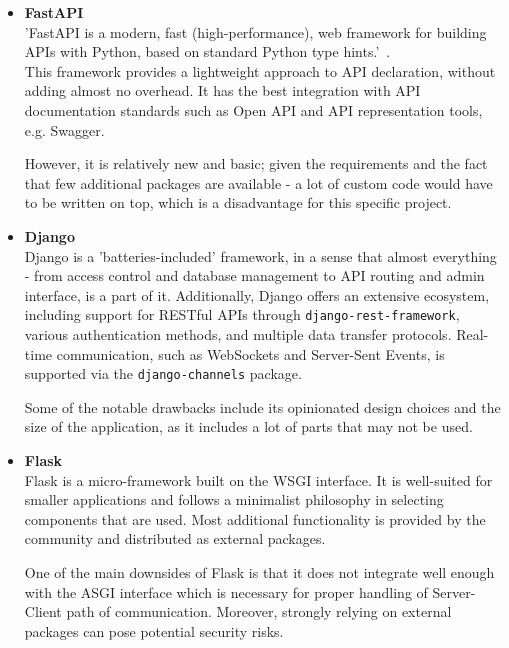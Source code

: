 \begin{itemize}
    \item \textbf{FastAPI} \\
    'FastAPI is a modern, fast (high-performance), web framework for building APIs
    with Python, based on standard Python type hints.'~\cite{fastapi}. \\
    This framework provides a lightweight approach to API declaration, without adding almost no overhead.
    It has the best integration with API documentation standards such as
    Open API and API representation tools, e.g. Swagger.

    However, it is relatively new and basic; given the requirements and the fact that
    few additional packages are available - a lot of custom code would have
    to be written on top, which is a disadvantage for this specific project.

    \item \textbf{Django} \\
    Django is a 'batteries-included' framework, in a sense that almost everything -
    from access control and database management to API routing and admin interface,
    is a part of it.\cite{django}
    Additionally, Django offers an extensive ecosystem, including support for RESTful APIs through
    \texttt{django-rest-framework}\cite{drf}, various authentication methods,
    and multiple data transfer protocols. Real-time communication, such as WebSockets and Server-Sent Events,
    is supported via the \texttt{django-channels}\cite{django_channels} package.

    Some of the notable drawbacks include its opinionated design choices and the size of the application,
    as it includes a lot of parts that may not be used.

    \item \textbf{Flask} \\
    Flask is a micro-framework built on the WSGI interface.
    It is well-suited for smaller applications and follows a minimalist philosophy
    in selecting components that are used.\cite{flask} Most additional functionality is provided by
    the community and distributed as external packages.

    One of the main downsides of Flask is that it does not integrate well enough with the ASGI
    interface which is necessary for proper handling of Server-Client path of communication.
    Moreover, strongly relying on external packages can pose potential security risks.
\end{itemize}


